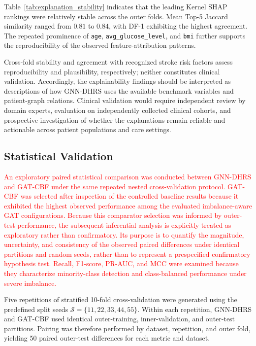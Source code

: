 \documentclass[pdflatex,sn-mathphys-num]{sn-jnl}%
\theoremstyle{thmstyleone}%
\theoremstyle{thmstyletwo}%
\theoremstyle{thmstylethree}%
\begin{document}
Table~\ref{tab:explanation_stability} indicates that the leading Kernel SHAP
rankings were relatively stable across the outer folds. Mean Top-5 Jaccard
similarity ranged from \(0.81\) to \(0.84\), with DF-1 exhibiting the highest
agreement. The repeated prominence of \texttt{age},
\texttt{avg\_glucose\_level}, and \texttt{bmi} further supports the
reproducibility of the observed feature-attribution patterns.

 {
Cross-fold stability and agreement with recognized stroke risk factors assess
reproducibility and plausibility, respectively; neither constitutes clinical
validation. Accordingly, the explainability findings should be interpreted as
descriptions of how GNN-DHRS uses the available benchmark variables and
patient-graph relations. Clinical validation would require independent review
by domain experts, evaluation on independently collected clinical cohorts,
and prospective investigation of whether the explanations remain reliable
and actionable across patient populations and care settings.
}
\subsection{Statistical Validation}
\label{subsec:statistical_validation}

\textcolor{red}{
An exploratory paired statistical comparison was conducted between GNN-DHRS
and GAT-CBF under the same repeated nested cross-validation protocol. GAT-CBF
\cite{velickovic2018graph,lin2017focal,cui2019class} was selected after
inspection of the controlled baseline results because it exhibited the
highest observed performance among the evaluated imbalance-aware GAT
configurations. Because this comparator selection was informed by outer-test
performance, the subsequent inferential analysis is explicitly treated as
exploratory rather than confirmatory. Its purpose is to quantify the
magnitude, uncertainty, and consistency of the observed paired differences
under identical partitions and random seeds, rather than to represent a
prespecified confirmatory hypothesis test. Recall, F1-score, PR-AUC, and MCC
were examined because they characterize minority-class detection and
class-balanced performance under severe imbalance.
}

 {
Five repetitions of stratified 10-fold cross-validation were generated using
the predefined split seeds
\(\mathcal{S}=\{11,22,33,44,55\}\). Within each repetition, GNN-DHRS and
GAT-CBF used identical outer-training, inner-validation, and outer-test
partitions. Pairing was therefore performed by dataset, repetition, and outer
fold, yielding 50 paired outer-test differences for each metric and dataset.
}
\end{document}
